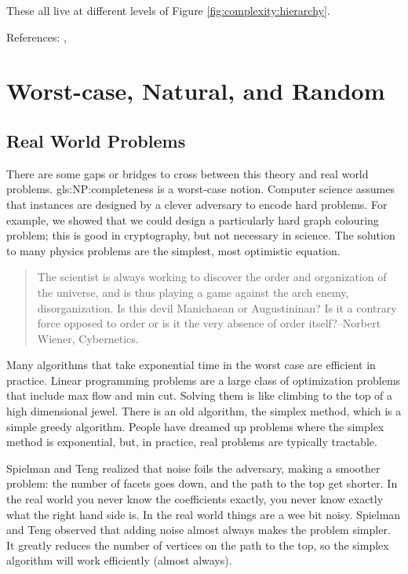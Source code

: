 \documentclass[]{article}
\begin{document}
These all live at different levels of Figure \ref{fig:complexity:hierarchy}.

References: \cite[Chapters 4-6]{moore2011nature}, \cite{sep-computability}
\section{Worst-case, Natural, and Random}


\subsection{Real World Problems}

There are some gaps or bridges to cross between this theory and real world problems. \gls{gls:NP:complete}ness is a worst-case notion. Computer science assumes that instances are designed by a clever adversary to encode hard problems. For example, we showed that we could design a particularly hard graph colouring problem; this is good in cryptography, but not necessary in science. The solution to many physics problems are the simplest, most optimistic equation.

\begin{quote}
	The scientist is always working to discover the order and organization of the universe, and is thus playing a game against the arch enemy, disorganization. Is this devil Manichaean or Augustininan? Is it a contrary force opposed to order or is it the very absence of order itself?--Norbert Wiener, Cybernetics.
\end{quote}

Many algorithms that take exponential time in the worst case are efficient in practice.
Linear programming problems are a large class of optimization problems that include max flow and min cut. Solving them is like climbing to the top of a high dimensional jewel. There is an old algorithm, the simplex method, which is a simple greedy algorithm. People have dreamed up problems where the simplex method is exponential, but, in practice, real problems are typically tractable.

Spielman and Teng\cite{spielman2004smoothed} realized that noise foils the adversary, making a smoother problem: the number of facets goes down, and the path to the top get shorter. In the real world you never know the coefficients exactly, you never know exactly what the right hand side is. In the real world things are a wee bit noisy. Spielman and Teng observed that adding noise almost always makes the problem simpler. It greatly reduces the number of vertices on the path to the top, so the simplex algorithm will work efficiently (almost always).
\end{document}

